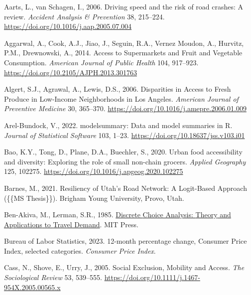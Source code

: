 \documentclass[
  letterpaper,
  DIV=11,
  numbers=noendperiod]{scrreport}
\newlength{\cslhangindent}
\newlength{\cslentryspacingunit} %
\newenvironment{CSLReferences}[2] %
 {%
  \setlength{\parindent}{0pt}
  \ifodd #1
  \let\oldpar\par
  \def\par{\hangindent=\cslhangindent\oldpar}
  \fi
  \setlength{\parskip}{#2\cslentryspacingunit}
 }%
 {}
\begin{document}
\hypertarget{refs}{}
\begin{CSLReferences}{1}{0}
\leavevmode{}%
Aarts, L., van Schagen, I., 2006. Driving speed and the risk of road
crashes: {A} review. \emph{Accident Analysis \& Prevention} 38,
215--224. \url{https://doi.org/10.1016/j.aap.2005.07.004}

\leavevmode{}%
Aggarwal, A., Cook, A.J., Jiao, J., Seguin, R.A., Vernez Moudon, A.,
Hurvitz, P.M., Drewnowski, A., 2014. Access to {Supermarkets} and
{Fruit} and {Vegetable Consumption}. \emph{American Journal of Public
Health} 104, 917--923. \url{https://doi.org/10.2105/AJPH.2013.301763}

\leavevmode{}%
Algert, S.J., Agrawal, A., Lewis, D.S., 2006. Disparities in {Access} to
{Fresh Produce} in {Low-Income Neighborhoods} in {Los Angeles}.
\emph{American Journal of Preventive Medicine} 30, 365--370.
\url{https://doi.org/10.1016/j.amepre.2006.01.009}

\leavevmode{}%
Arel-Bundock, V., 2022. {modelsummary}: Data and model summaries in {R}.
\emph{Journal of Statistical Software} 103, 1--23.
\url{https://doi.org/10.18637/jss.v103.i01}

\leavevmode{}%
Bao, K.Y., Tong, D., Plane, D.A., Buechler, S., 2020. Urban food
accessibility and diversity: {Exploring} the role of small non-chain
grocers. \emph{Applied Geography} 125, 102275.
\url{https://doi.org/10.1016/j.apgeog.2020.102275}

\leavevmode{}%
Barnes, M., 2021. Resiliency of {Utah}'s {Road Network}: {A Logit-Based
Approach} (\{\{MS Thesis\}\}). Brigham Young University, {Provo, Utah}.

\leavevmode{}%
Ben-Akiva, M., Lerman, S.R., 1985.
\href{https://www.jstor.org/stable/1391567}{Discrete {Choice Analysis}:
{Theory} and {Applications} to {Travel Demand}}. {MIT Press}.

\leavevmode{}%
Bureau of Labor Statistics, 2023. 12-month percentage change, {Consumer
Price Index}, selected categories. \emph{Consumer Price Index}.

\leavevmode{}%
Cass, N., Shove, E., Urry, J., 2005. Social {Exclusion}, {Mobility} and
{Access}. \emph{The Sociological Review} 53, 539--555.
\url{https://doi.org/10.1111/j.1467-954X.2005.00565.x}


\end{CSLReferences}
\end{document}
